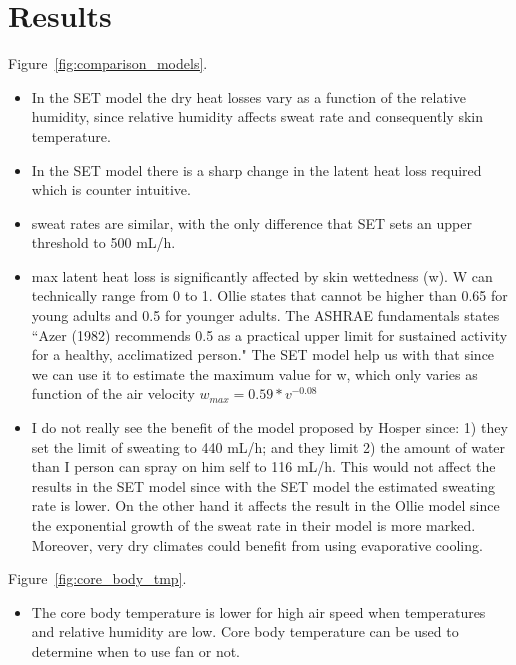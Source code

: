 

\section{Results}\label{sec:results}

Figure~\ref{fig:comparison_models}.

\begin{itemize}
    \item In the SET model the dry heat losses vary as a function of the relative humidity, since relative humidity affects sweat rate and consequently skin temperature.
    \item In the SET model there is a sharp change in the latent heat loss required which is counter intuitive.
    \item sweat rates are similar, with the only difference that SET sets an upper threshold to 500 mL/h.
    \item max latent heat loss is significantly affected by skin wettedness (w). W can technically range from 0 to 1.
    Ollie states that cannot be higher than 0.65 for young adults and 0.5 for younger adults.
    The ASHRAE fundamentals states ``Azer (1982) recommends 0.5 as a practical upper limit for sustained activity for a healthy, acclimatized person."
    The SET model help us with that since we can use it to estimate the maximum value for w, which only varies as function of the air velocity $w_{max} = 0.59 * v^{-0.08}$
    \item I do not really see the benefit of the model proposed by Hosper since: 1) they set the limit of sweating to 440 mL/h; and they limit 2) the amount of water than I person can spray on him self to 116 mL/h. This would not affect the results in the SET model since with the SET model the estimated sweating rate is lower.
    On the other hand it affects the result in the Ollie model since the exponential growth of the sweat rate in their model is more marked.
    Moreover, very dry climates could benefit from using evaporative cooling.
\end{itemize}

Figure~\ref{fig:core_body_tmp}.

\begin{itemize}
    \item The core body temperature is lower for high air speed when temperatures and relative humidity are low.
    Core body temperature can be used to determine when to use fan or not.
\end{itemize}

